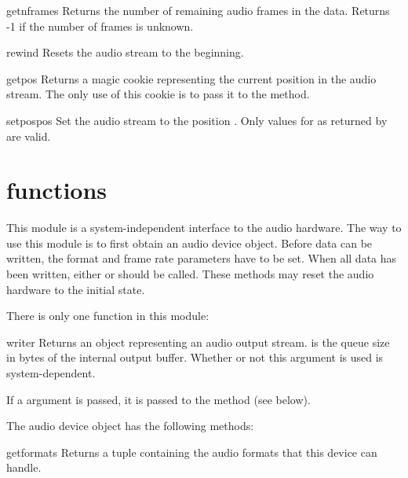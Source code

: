 \begin{methoddesc}{getnframes}{}
Returns the number of remaining audio frames in the data.  Returns -1
if the number of frames is unknown.
\end{methoddesc}

\begin{methoddesc}{rewind}{}
Resets the audio stream to the beginning.
\end{methoddesc}

\begin{methoddesc}{getpos}{}
Returns a magic cookie representing the current position in the audio
stream.  The only use of this cookie is to pass it to the
 method.
\end{methoddesc}

\begin{methoddesc}{setpos}{pos}
Set the audio stream to the position .  Only values for
 as returned by  are valid.
\end{methoddesc}

\section{ functions}

This module is a system-independent interface to the audio hardware.
The way to use this module is to first obtain an audio device object.
Before data can be written, the format and frame rate parameters have
to be set.  When all data has been written, either  or
 should be called.  These methods may reset the audio
hardware to the initial state.

There is only one function in this module:

\begin{funcdesc}{writer}{}
Returns an object representing an audio output stream.   is
the queue size in bytes of the internal output buffer.  Whether or not
this argument is used is system-dependent.

If a  argument is passed, it is passed to the 
method (see below).
\end{funcdesc}

The audio device object has the following methods:

\begin{methoddesc}{getformats}{}
Returns a tuple containing the audio formats that this device can
handle.
\end{methoddesc}

